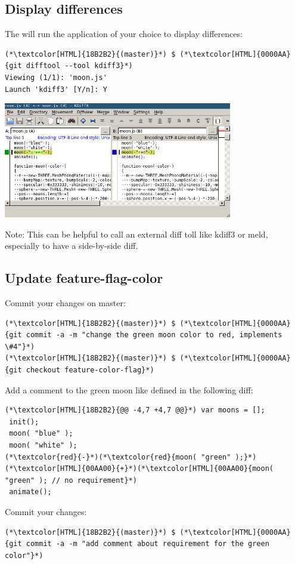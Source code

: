 \subsection{Display differences}
\begin{frame}[fragile]
    \subslidetitle
  The  will run the application of your choice to display differences:
  \begin{lstlisting}
(*\textcolor[HTML]{18B2B2}{(master)}*) $ (*\textcolor[HTML]{0000AA}{git difftool --tool kdiff3}*)
Viewing (1/1): 'moon.js'
Launch 'kdiff3' [Y/n]: Y
\end{lstlisting}

  \vspace{1em}
  \centerline{\includegraphics[width=10cm]{../screen/git-difftool-kdiff3.png}}

  Note: This can be helpful to call an external diff toll like kdiff3 or meld, especially to have a side-by-side diff.

\end{frame}


\subsection{Update feature-flag-color}
\begin{frame}[fragile]
    \subslidetitle
  Commit your changes on master:
\begin{lstlisting}
(*\textcolor[HTML]{18B2B2}{(master)}*) $ (*\textcolor[HTML]{0000AA}{git commit -a -m "change the green moon color to red, implements \#4"}*)
(*\textcolor[HTML]{18B2B2}{(master)}*) $ (*\textcolor[HTML]{0000AA}{git checkout feature-color-flag}*)
\end{lstlisting}

  Add a comment to the green moon like defined in the following diff:
  \begin{lstlisting}
(*\textcolor[HTML]{18B2B2}{@@ -4,7 +4,7 @@}*) var moons = [];
 init();
 moon( "blue" );
 moon( "white" );
(*\textcolor{red}{-}*)(*\textcolor{red}{moon( "green" );}*)
(*\textcolor[HTML]{00AA00}{+}*)(*\textcolor[HTML]{00AA00}{moon( "green" ); // no requirement}*)
 animate();
\end{lstlisting}

  Commit your changes:
  \begin{lstlisting}
(*\textcolor[HTML]{18B2B2}{(master)}*) $ (*\textcolor[HTML]{0000AA}{git commit -a -m "add comment about requirement for the green color"}*)
\end{lstlisting}
\end{frame}

